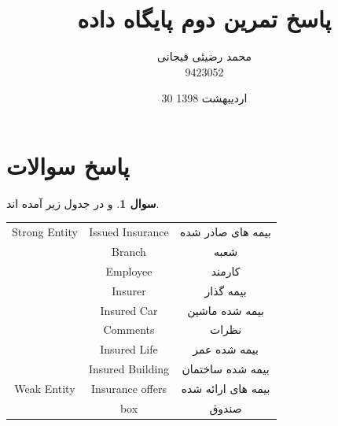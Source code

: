 \documentclass[12pt]{article}
\title{پاسخ تمرین دوم پایگاه داده}
\author{محمد رضیئی فیجانی\\ 9423052}
\date{30 اردیبهشت 1398}
\theoremstyle{definition}
\newtheorem{question}{سوال}
\begin{document}
\maketitle

\section{پاسخ سوالات}\label{chpt1}

\begin{question}
  و  در جدول زیر آمده اند.

\begin{table}[h!]
	\centering
	\begin{tabular}{ | c | c | c | }
		\hline
		Strong Entity & Issued Insurance & بیمه های صادر شده \\ \cline{2-3}
		& Branch & شعبه \\ \cline{2-3}
		& Employee & کارمند \\ \cline{2-3}
		& Insurer & بیمه گذار \\ \cline{2-3}
		& Insured Car & بیمه شده ماشین \\ \cline{2-3}
		& Comments & نظرات \\ \cline{2-3}
		& Insured Life & بیمه شده عمر \\ \cline{2-3}
		& Insured Building & بیمه شده ساختمان \\ \hline\hline
		Weak Entity & Insurance offers & بیمه های ارائه شده \\ \cline{2-3}
		& box & صندوق \\ \hline
	\end{tabular}
\end{table}		
\end{question}
\end{document}
